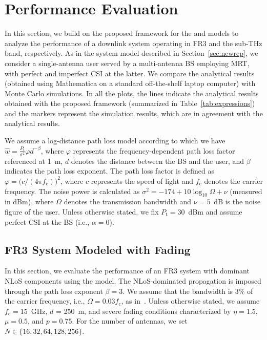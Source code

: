 \documentclass[journal,twocolumn]{IEEEtran}
\begin{document}
\section{Performance Evaluation} \label{sec:num}

In this section, we build on the proposed framework for the \Ehm{} and \km{} models to analyze the performance of a downlink system operating in FR3 and the sub-THz band, respectively. As in the system model described in Section~\ref{sec:newrep}, we consider a single-antenna user served by a multi-antenna \ac{BS} employing \ac{MRT}, with perfect and imperfect \ac{CSI} at the latter. We compare the analytical results (obtained using Mathematica on a standard off-the-shelf laptop computer) with Monte Carlo simulations. In all the plots, the lines indicate the analytical results obtained with the proposed framework (summarized in Table~\ref{tab:expressions}) and the markers represent the simulation results, which are in agreement with the analytical results.

We assume a log-distance path loss model according to which we have $\hat{w} = \frac{P_{\textrm{t}}}{\sigma^{2}} \varphi d^{-\beta}$, where $\varphi$ represents the frequency-dependent path loss factor referenced at 1~m, $d$ denotes the distance between the BS and the user, and $\beta$ indicates the path loss exponent. The path loss factor is defined as $\varphi = \big( c/(4\pi f_\textrm{c}) \big)^{2}$, where $c$ represents the speed of light and $f_\textrm{c}$ denotes the carrier frequency. The noise power is calculated as $\sigma^2 = -174 + 10\log_{10} \Omega+ \nu$ (measured in dBm), where $\Omega$ denotes the transmission bandwidth and $\nu = 5$~dB is the noise figure of the user. Unless otherwise stated, we fix $P_{\textrm{t}} = 30$~dBm and assume perfect \ac{CSI} at the \ac{BS} (i.e., $\alpha = 0$).

 
\subsection{FR3 System Modeled with \Ehm{} Fading} \label{sec:num_mmwave}

In this section, we evaluate the performance of an FR3 system with dominant \ac{NLoS} components using the \Ehm{} model. The \ac{NLoS}-dominated propagation is imposed through the path loss exponent $\beta = 3$. We assume that the bandwidth is $3 \%$ of the carrier frequency, i.e., $\Omega = 0.03 f_{\textrm{c}}$, as in~\cite{Kan24}. Unless otherwise stated, we assume $f_{\textrm{c}} = 15$~GHz, $d$ = 250~m, and severe fading conditions characterized by $\eta = 1.5$, $\mu = 0.5$, and $p = 0.75$. For the number of antennas, we set $N \in \{16,32,64,128,256\}$.
\end{document}

